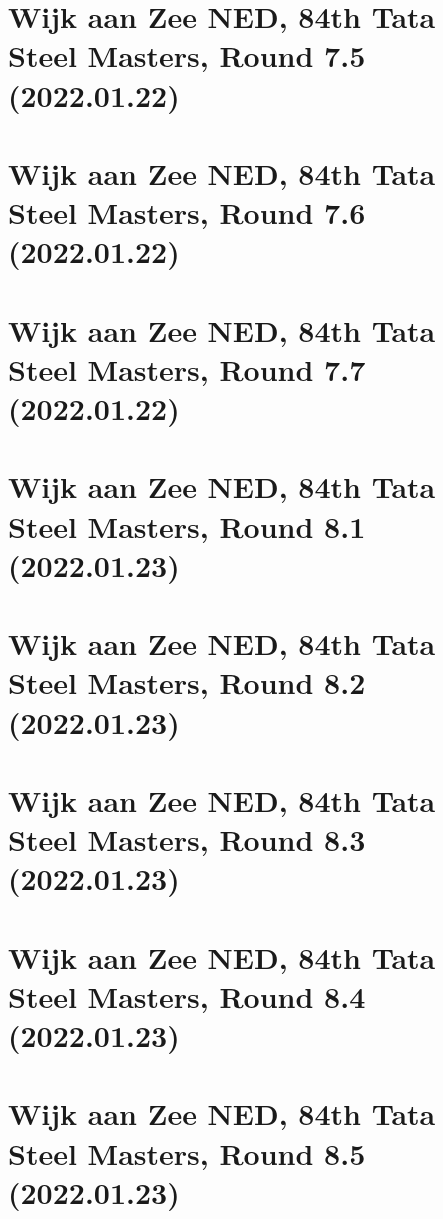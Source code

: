 \documentclass[11pt]{article}
\newcommand*\cleartoleftpage{%
   \clearpage
   \ifodd\value{page}\hbox{}\newpage\fi
}
\begin{document}
\cleartoleftpage

\section{Wijk aan Zee NED, 84th Tata Steel Masters, Round 7.5 (2022.01.22)}


\cleartoleftpage

\section{Wijk aan Zee NED, 84th Tata Steel Masters, Round 7.6 (2022.01.22)}


\cleartoleftpage

\section{Wijk aan Zee NED, 84th Tata Steel Masters, Round 7.7 (2022.01.22)}


\cleartoleftpage

\section{Wijk aan Zee NED, 84th Tata Steel Masters, Round 8.1 (2022.01.23)}


\cleartoleftpage

\section{Wijk aan Zee NED, 84th Tata Steel Masters, Round 8.2 (2022.01.23)}


\cleartoleftpage

\section{Wijk aan Zee NED, 84th Tata Steel Masters, Round 8.3 (2022.01.23)}


\cleartoleftpage

\section{Wijk aan Zee NED, 84th Tata Steel Masters, Round 8.4 (2022.01.23)}


\cleartoleftpage

\section{Wijk aan Zee NED, 84th Tata Steel Masters, Round 8.5 (2022.01.23)}

\end{document}
